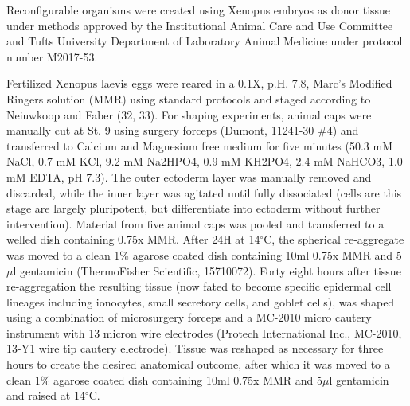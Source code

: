 Reconfigurable organisms were created using Xenopus embryos as donor tissue under methods approved by the Institutional Animal Care and Use Committee and Tufts University Department of Laboratory Animal Medicine under protocol number M2017-53. 

Fertilized Xenopus laevis eggs were reared in a 0.1X, p.H. 7.8, Marc's Modified Ringers solution (MMR) using standard protocols and staged according to Neiuwkoop and Faber (32, 33). For shaping experiments, animal caps were manually cut at St. 9 using surgery forceps (Dumont, 11241-30 \#4) and transferred to Calcium and Magnesium free medium for five minutes (50.3 mM NaCl, 0.7 mM KCl, 9.2 mM Na2HPO4, 0.9 mM KH2PO4, 2.4 mM NaHCO3, 1.0 mM EDTA, pH 7.3). The outer ectoderm layer was manually removed and discarded, while the inner layer was agitated until fully dissociated (cells are this stage are largely pluripotent, but differentiate into ectoderm without further intervention). Material from five animal caps was pooled and transferred to a welled dish containing 0.75x MMR. After 24H at 14{$^{\circ}$}C, the spherical re-aggregate was moved to a clean 1\% agarose coated dish containing 10ml 0.75x MMR and 5{$\mu$}l gentamicin (ThermoFisher Scientific, 15710072). Forty eight hours after tissue re-aggregation the resulting tissue (now fated to become specific epidermal cell lineages including ionocytes, small secretory cells, and goblet cells), was shaped using a combination of microsurgery forceps and a MC-2010 micro cautery instrument with 13 micron wire electrodes (Protech International Inc., MC-2010, 13-Y1 wire tip cautery electrode). Tissue was reshaped as necessary for three hours to create the desired anatomical outcome, after which it was moved to a clean 1\% agarose coated dish containing 10ml 0.75x MMR and 5{$\mu$}l gentamicin and raised at 14{$^{\circ}$}C.

